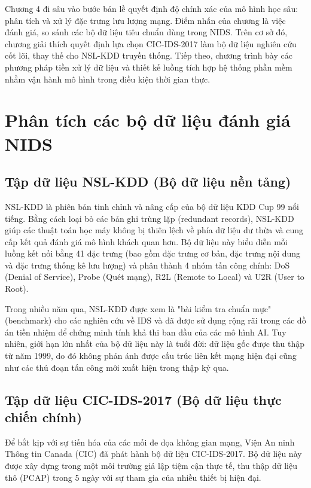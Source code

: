 \documentclass[../DoAn.tex]{subfiles}
\begin{document}
Chương 4 đi sâu vào bước bản lề quyết định độ chính xác của mô hình học sâu: phân tích và xử lý đặc trưng lưu lượng mạng. Điểm nhấn của chương là việc đánh giá, so sánh các bộ dữ liệu tiêu chuẩn dùng trong NIDS. Trên cơ sở đó, chương giải thích quyết định lựa chọn CIC-IDS-2017 làm bộ dữ liệu nghiên cứu cốt lõi, thay thế cho NSL-KDD truyền thống. Tiếp theo, chương trình bày các phương pháp tiền xử lý dữ liệu và thiết kế luồng tích hợp hệ thống phần mềm nhằm vận hành mô hình trong điều kiện thời gian thực.

\section{Phân tích các bộ dữ liệu đánh giá NIDS}

\subsection{Tập dữ liệu NSL-KDD (Bộ dữ liệu nền tảng)}
NSL-KDD là phiên bản tinh chỉnh và nâng cấp của bộ dữ liệu KDD Cup 99 nổi tiếng. Bằng cách loại bỏ các bản ghi trùng lặp (redundant records), NSL-KDD giúp các thuật toán học máy không bị thiên lệch về phía dữ liệu dư thừa và cung cấp kết quả đánh giá mô hình khách quan hơn. Bộ dữ liệu này biểu diễn mỗi luồng kết nối bằng 41 đặc trưng (bao gồm đặc trưng cơ bản, đặc trưng nội dung và đặc trưng thống kê lưu lượng) và phân thành 4 nhóm tấn công chính: DoS (Denial of Service), Probe (Quét mạng), R2L (Remote to Local) và U2R (User to Root).

Trong nhiều năm qua, NSL-KDD được xem là "bài kiểm tra chuẩn mực" (benchmark) cho các nghiên cứu về IDS và đã được sử dụng rộng rãi trong các đồ án tiền nhiệm để chứng minh tính khả thi ban đầu của các mô hình AI. Tuy nhiên, giới hạn lớn nhất của bộ dữ liệu này là tuổi đời: dữ liệu gốc được thu thập từ năm 1999, do đó không phản ánh được cấu trúc liên kết mạng hiện đại cũng như các thủ đoạn tấn công mới xuất hiện trong thập kỷ qua.

\subsection{Tập dữ liệu CIC-IDS-2017 (Bộ dữ liệu thực chiến chính)}
Để bắt kịp với sự tiến hóa của các mối đe dọa không gian mạng, Viện An ninh Thông tin Canada (CIC) đã phát hành bộ dữ liệu CIC-IDS-2017. Bộ dữ liệu này được xây dựng trong một môi trường giả lập tiệm cận thực tế, thu thập dữ liệu thô (PCAP) trong 5 ngày với sự tham gia của nhiều thiết bị hiện đại.
\end{document}
